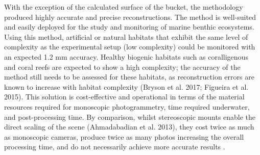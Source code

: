 \medskip
With the exception of the calculated surface of the bucket, the methodology produced highly accurate and precise reconstructions. The method is well-suited and easily deployed for the study and monitoring of marine benthic ecosystems. Using this method, artificial or natural habitats that exhibit the same level of complexity as the experimental setup (low complexity) could be monitored with an expected 1.2 mm accuracy. Healthy biogenic habitats such as coralligenous and coral reefs are expected to show a high complexity; the accuracy of the method still needs to be assessed for these habitats, as reconstruction errors are known to increase with habitat complexity (Bryson et al. 2017; Figueira et al. 2015). This solution is cost-effective and operational in terms of the material resources required for monoscopic photogrammetry, time required underwater, and post-processing time. By comparison, whilst stereoscopic mounts enable the direct scaling of the scene (Ahmadabadian et al. 2013), they cost twice as much as monoscopic cameras, produce twice as many photos increasing the overall processing time, and do not necessarily achieve more accurate results \citep{figueira_accuracy_2015, abdo_efficiently_2006, bryson_characterization_2017}.

